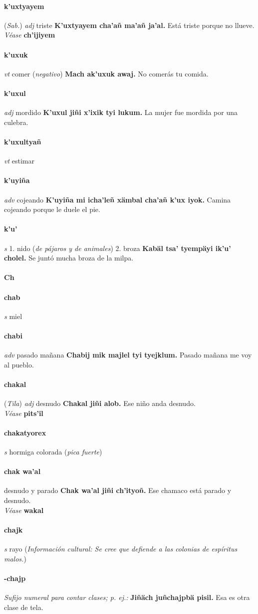 \documentclass{scrbook}
\newcommand{\entry}[1]{\paragraph{#1}}
\newcommand{\alphaletter}[1]{\addsec{#1}}
\newcommand{\onedefinition}[1]{#1.}
\newcommand{\nontranslationdef}[1]{\textit{#1}}
\newcommand{\partofspeech}[1]{\textit{#1}}
\newcommand{\spanishtranslation}[1]{#1}
\newcommand{\clarification}[1]{(\textit{#1})}
\newcommand{\cholexample}[1]{\textbf{#1}}
\newcommand{\exampletranslation}[1]{#1}
\newcommand{\alsosee}[1]{\\\textit{Véase} \textbf{#1}}
\newcommand{\relevantdialect}[1]{(\textit{#1})}
\newcommand{\culturalinformation}[1]{(\textit{#1})}
\begin{document}
\begin{multicols}{2}
\entry{k'uxtyayem}
\relevantdialect{Sab.}
\partofspeech{adj}
\spanishtranslation{triste}
\cholexample{K'uxtyayem cha'añ ma'añ ja'al.}
\exampletranslation{Está triste porque no llueve.}
\alsosee{ch'ijiyem}

\entry{k'uxuk}
\partofspeech{vt}
\spanishtranslation{comer}
\clarification{negativo}
\cholexample{Mach ak'uxuk awaj.}
\exampletranslation{No comerás tu comida.}

\entry{k'uxul}
\partofspeech{adj}
\spanishtranslation{mordido}
\cholexample{K'uxul jiñi x'ixik tyi lukum.}
\exampletranslation{La mujer fue mordida por una culebra.}

\entry{k'uxultyañ}
\partofspeech{vt}
\spanishtranslation{estimar}

\entry{k'uyiña}
\partofspeech{adv}
\spanishtranslation{cojeando}
\cholexample{K'uyiña mi icha'leñ xämbal cha'añ k'ux iyok.}
\exampletranslation{Camina cojeando porque le duele el pie.}

\entry{k'u'}
\partofspeech{s}
\onedefinition{1}
\spanishtranslation{nido}
\clarification{de pájaros y de animales}
\onedefinition{2}
\spanishtranslation{broza}
\cholexample{Kabäl tsa' tyempäyi ik'u' cholel.}
\exampletranslation{Se juntó mucha broza de la milpa.}

\entry{Ch}
\alphaletter{Ch}

\entry{chab}
\partofspeech{s}
\spanishtranslation{miel}

\entry{chabi}
\partofspeech{adv}
\spanishtranslation{pasado mañana}
\cholexample{Chabij mik majlel tyi tyejklum.}
\exampletranslation{Pasado mañana me voy al pueblo.}

\entry{chakal}
\relevantdialect{Tila}
\partofspeech{adj}
\spanishtranslation{desnudo}
\cholexample{Chakal jiñi alob.}
\exampletranslation{Ese niño anda desnudo.}
\alsosee{pits'il}

\entry{chakatyorex}
\partofspeech{s}
\spanishtranslation{hormiga colorada}
\clarification{pica fuerte}

\entry{chak wa'al}
\spanishtranslation{desnudo y parado}
\cholexample{Chak wa'al jiñi ch'ityoñ.}
\exampletranslation{Ese chamaco está parado y desnudo.}
\alsosee{wakal}

\entry{chajk}
\partofspeech{s}
\spanishtranslation{rayo}
\culturalinformation{Información cultural: Se cree que defiende a las colonias de espíritus malos.}

\entry{-chajp}
\nontranslationdef{Sufijo numeral para contar clases; p. ej.:}
\cholexample{Jiñäch juñchajpbä pisil.}
\exampletranslation{Esa es otra clase de tela.}


\end{multicols}
\end{document}
